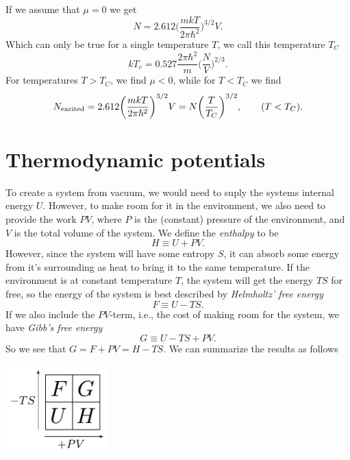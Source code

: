 \documentclass[a4paper, 11pt, notitlepage, english]{article}
\begin{document}
If we assume that $\mu = 0$ we get
$$N = 2.612\bigg(\frac{m kT}{2\pi \hbar^2}\bigg)^{3/2}V.$$
Which can only be true for a single temperature $T$, we call this temperature $T_C$
$$kT_c = 0.527 \frac{2\pi \hbar^2}{m}\bigg(\frac{N}{V}\bigg)^{2/3}.$$
For temperatures $T>T_C$, we find $\mu < 0$, while for $T<T_C$ we find
$$N_{\rm excited} = 2.612 \bigg(\frac{mkT}{2\pi\hbar^2}\bigg)^{3/2}V = N\bigg(\frac{T}{T_C}\bigg)^{3/2}, \qquad (T < T_C).$$

\clearpage

\section*{Thermodynamic potentials}

To create a system from vacuum, we would need to suply the systems internal energy $U$. However, to make room for it in the environment, we also need to provide the work $PV$, where $P$ is the (constant) pressure of the environment, and $V$ is the total volume of the system. We define the \emph{enthalpy} to be 
$$H \equiv U + PV.$$
However, since the system will have some entropy $S$, it can absorb some energy from it's surrounding as heat to bring it to the same temperature. If the environment is at constant temperature $T$, the system will get the energy $TS$ for free, so the energy of the system is best described by \emph{Helmholtz' free energy}
$$F \equiv U - TS.$$
If we also include the $PV$-term, i.e., the cost of making room for the system, we have \emph{Gibb's free energy}
$$G \equiv U - TS + PV.$$
So we see that $G = F + PV = H - TS$. We can summarize the results as follows
\begin{center}
\includegraphics[width=0.3\textwidth]{potentials}
\end{center}
\end{document}
